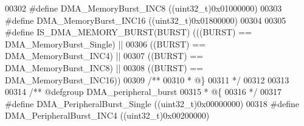 \begin{DoxyCode}
00302 \textcolor{preprocessor}{#}\textcolor{preprocessor}{define} \textcolor{preprocessor}{DMA\_MemoryBurst\_INC8}              \textcolor{preprocessor}{(}\textcolor{preprocessor}{(}\textcolor{preprocessor}{uint32\_t}\textcolor{preprocessor}{)}0x01000000\textcolor{preprocessor}{)}
00303 \textcolor{preprocessor}{#}\textcolor{preprocessor}{define} \textcolor{preprocessor}{DMA\_MemoryBurst\_INC16}             \textcolor{preprocessor}{(}\textcolor{preprocessor}{(}\textcolor{preprocessor}{uint32\_t}\textcolor{preprocessor}{)}0x01800000\textcolor{preprocessor}{)}
00304 
00305 \textcolor{preprocessor}{#}\textcolor{preprocessor}{define} \textcolor{preprocessor}{IS\_DMA\_MEMORY\_BURST}\textcolor{preprocessor}{(}\textcolor{preprocessor}{BURST}\textcolor{preprocessor}{)} \textcolor{preprocessor}{(}\textcolor{preprocessor}{(}\textcolor{preprocessor}{(}\textcolor{preprocessor}{BURST}\textcolor{preprocessor}{)} \textcolor{preprocessor}{==} DMA_MemoryBurst_Single\textcolor{preprocessor}{)} \textcolor{preprocessor}{||}
00306                                     \textcolor{preprocessor}{(}\textcolor{preprocessor}{(}\textcolor{preprocessor}{BURST}\textcolor{preprocessor}{)} \textcolor{preprocessor}{==} DMA_MemoryBurst_INC4\textcolor{preprocessor}{)}  \textcolor{preprocessor}{||}
00307                                     \textcolor{preprocessor}{(}\textcolor{preprocessor}{(}\textcolor{preprocessor}{BURST}\textcolor{preprocessor}{)} \textcolor{preprocessor}{==} DMA_MemoryBurst_INC8\textcolor{preprocessor}{)}  \textcolor{preprocessor}{||}
00308                                     \textcolor{preprocessor}{(}\textcolor{preprocessor}{(}\textcolor{preprocessor}{BURST}\textcolor{preprocessor}{)} \textcolor{preprocessor}{==} DMA_MemoryBurst_INC16\textcolor{preprocessor}{)}\textcolor{preprocessor}{)}
00309 \textcolor{comment}{/**}
00310 \textcolor{comment}{  * @\}}
00311 \textcolor{comment}{  */}
00312 
00313 
00314 \textcolor{comment}{/** @defgroup DMA\_peripheral\_burst }
00315 \textcolor{comment}{  * @\{}
00316 \textcolor{comment}{  */}
00317 \textcolor{preprocessor}{#}\textcolor{preprocessor}{define} \textcolor{preprocessor}{DMA\_PeripheralBurst\_Single}        \textcolor{preprocessor}{(}\textcolor{preprocessor}{(}\textcolor{preprocessor}{uint32\_t}\textcolor{preprocessor}{)}0x00000000\textcolor{preprocessor}{)}
00318 \textcolor{preprocessor}{#}\textcolor{preprocessor}{define} \textcolor{preprocessor}{DMA\_PeripheralBurst\_INC4}          \textcolor{preprocessor}{(}\textcolor{preprocessor}{(}\textcolor{preprocessor}{uint32\_t}\textcolor{preprocessor}{)}0x00200000\textcolor{preprocessor}{)}

\end{DoxyCode}
